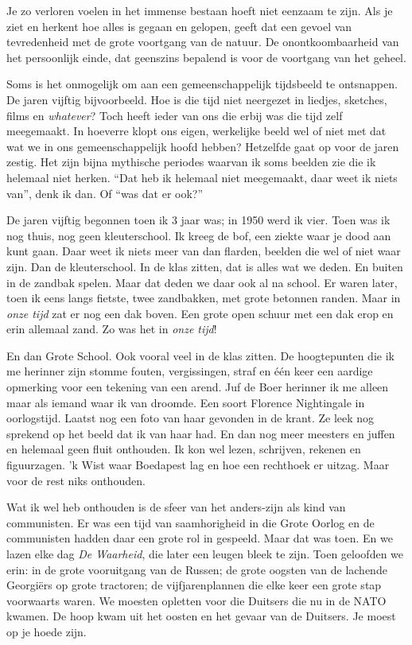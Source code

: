 \documentclass[10pt,twoside,openright]{memoir}
\begin{document}
Je zo verloren voelen in het immense bestaan hoeft niet eenzaam te zijn. Als je ziet en herkent hoe alles is gegaan en gelopen, geeft dat een gevoel van tevredenheid met de grote voortgang van de natuur. De onontkoombaarheid van het persoonlijk einde, dat geenszins bepalend is voor de voortgang van het geheel.

Soms is het onmogelijk om aan een gemeenschappelijk tijdsbeeld te ontsnappen. De jaren vijftig bijvoorbeeld. Hoe is die tijd niet neergezet in liedjes, sketches, films en \emph{whatever}? Toch heeft ieder van ons die erbij was die tijd zelf meegemaakt. In hoeverre klopt ons eigen, werkelijke beeld wel of niet met dat wat we in ons gemeenschappelijk hoofd hebben? Hetzelfde gaat op voor de jaren zestig. Het zijn bijna mythische periodes waarvan ik soms beelden zie die ik helemaal niet herken. ``Dat heb ik helemaal niet meegemaakt, daar weet ik niets van'', denk ik dan. Of ``was dat er ook?''

De jaren vijftig begonnen toen ik 3 jaar was; in 1950 werd ik vier. Toen was ik nog thuis, nog geen kleuterschool. Ik kreeg de bof, een ziekte waar je dood aan kunt gaan. Daar weet ik niets meer van dan flarden, beelden die wel of niet waar zijn. Dan de kleuterschool. In de klas zitten, dat is alles wat we deden. En buiten in de zandbak spelen. Maar dat deden we daar ook al na school. Er waren later, toen ik eens langs fietste, twee zandbakken, met grote betonnen randen. Maar in \emph{onze tijd} zat er nog een dak boven. Een grote open schuur met een dak erop en erin allemaal zand. Zo was het in \emph{onze tijd}!

En dan Grote School. Ook vooral veel in de klas zitten. De hoogtepunten die ik me herinner zijn stomme fouten, vergissingen, straf en één keer een aardige opmerking voor een tekening van een arend. Juf de Boer herinner ik me alleen maar als iemand waar ik van droomde. Een soort Florence Nightingale in oorlogstijd. Laatst nog een foto van haar gevonden in de krant. Ze leek nog sprekend op het beeld dat ik van haar had. En dan nog meer meesters en juffen en helemaal geen fluit onthouden. Ik kon wel lezen, schrijven, rekenen en figuurzagen. 'k Wist waar Boedapest lag en hoe een rechthoek er uitzag. Maar voor de rest niks onthouden.

Wat ik wel heb onthouden is de sfeer van het anders-zijn als kind van communisten. Er was een tijd van saamhorigheid in die Grote Oorlog en de communisten hadden daar een grote rol in gespeeld. Maar dat was toen. En we lazen elke dag \emph{De Waarheid}, die later een leugen bleek te zijn. Toen geloofden we erin: in de grote vooruitgang van de Russen; de grote oogsten van de lachende Georgiërs op grote tractoren; de vijfjarenplannen die elke keer een grote stap voorwaarts waren. We moesten opletten voor die Duitsers die nu in de NATO kwamen. De hoop kwam uit het oosten en het gevaar van de Duitsers. Je moest op je hoede zijn.
\end{document}
